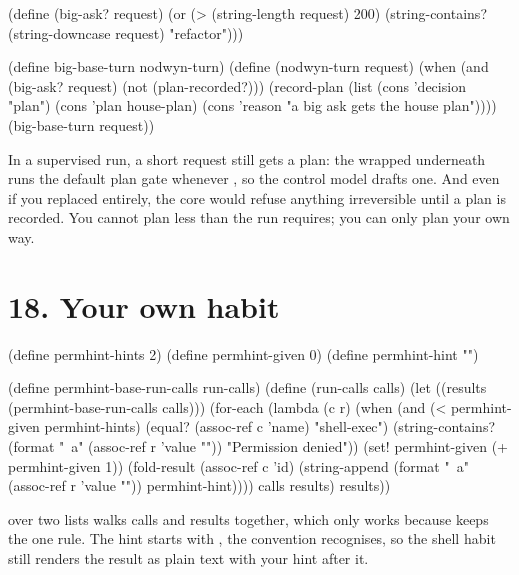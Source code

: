 \begin{scm}
(define (big-ask? request)
  (or (> (string-length request) 200)
      (string-contains? (string-downcase request) "refactor")))

(define big-base-turn nodwyn-turn)
(define (nodwyn-turn request)
  (when (and (big-ask? request) (not (plan-recorded?)))
    (record-plan (list (cons 'decision "plan") (cons 'plan house-plan)
                       (cons 'reason "a big ask gets the house plan"))))
  (big-base-turn request))
\end{scm}

In a supervised run, a short request still gets a plan: the wrapped
 underneath runs the default plan gate whenever
, so the control model drafts one. And even if you
replaced  entirely, the core would refuse anything
irreversible until a plan is recorded. You cannot plan less than the run
requires; you can only plan your own way.

\section*{18. Your own habit}

\begin{scm}
(define permhint-hints 2)
(define permhint-given 0)
(define permhint-hint
  "")

(define permhint-base-run-calls run-calls)
(define (run-calls calls)
  (let ((results (permhint-base-run-calls calls)))
    (for-each
     (lambda (c r)
       (when (and (< permhint-given permhint-hints)
                  (equal? (assoc-ref c 'name) "shell-exec")
                  (string-contains? (format "~a" (assoc-ref r 'value "")) "Permission denied"))
         (set! permhint-given (+ permhint-given 1))
         (fold-result (assoc-ref c 'id)
                      (string-append (format "~a" (assoc-ref r 'value "")) permhint-hint))))
     calls results)
    results))
\end{scm}

 over two lists walks calls and results together, which
only works because  keeps the one rule. The hint starts
with \code{"\textbackslash n[hint:"}, the convention 
recognises, so the shell habit still renders the result as plain text with
your hint after it.
